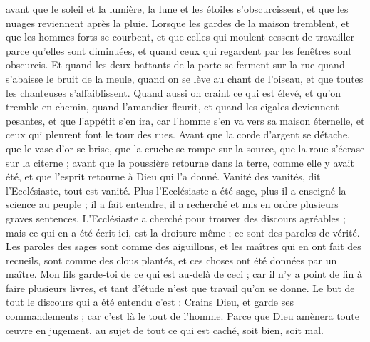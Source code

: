 \begin{multicols}{2}
avant que le soleil et la lumière, la lune et les étoiles s'obscurcissent, et que les nuages reviennent après la pluie.
Lorsque les gardes de la maison tremblent, et que les hommes forts se courbent, et que celles qui moulent cessent de travailler parce qu'elles sont diminuées, et quand ceux qui regardent par les fenêtres sont obscurcis.
Et quand les deux battants de la porte se ferment sur la rue quand s'abaisse le bruit de la meule, quand on se lève au chant de l'oiseau, et que toutes les chanteuses s'affaiblissent.
Quand aussi on craint ce qui est élevé, et qu'on tremble en chemin, quand l'amandier fleurit, et quand les cigales deviennent pesantes, et que l'appétit s'en ira, car l'homme s'en va vers sa maison éternelle, et ceux qui pleurent font le tour des rues.
Avant que la corde d'argent se détache, que le vase d'or se brise, que la cruche se rompe sur la source, que la roue s'écrase sur la citerne ;
avant que la poussière retourne dans la terre, comme elle y avait été, et que l'esprit retourne à Dieu qui l'a donné.
Vanité des vanités, dit l'Ecclésiaste, tout est vanité.
Plus l'Ecclésiaste a été sage, plus il a enseigné la science au peuple ; il a fait entendre, il a recherché et mis en ordre plusieurs graves sentences. 
L'Ecclésiaste a cherché pour trouver des discours agréables ; mais ce qui en a été écrit ici, est la droiture même ; ce sont des paroles de vérité. 
Les paroles des sages sont comme des aiguillons, et les maîtres qui en ont fait des recueils, sont comme des clous plantés, et ces choses ont été données par un maître.
Mon fils garde-toi de ce qui est au-delà de ceci ; car il n'y a point de fin à faire plusieurs livres, et tant d'étude n'est que travail qu'on se donne.  
Le but de tout le discours qui a été entendu c'est : Crains Dieu, et garde ses commandements ; car c'est là le tout de l'homme.
Parce que Dieu amènera toute œuvre en jugement, au sujet de tout ce qui est caché, soit bien, soit mal.
\PPE{}
\end{multicols}

